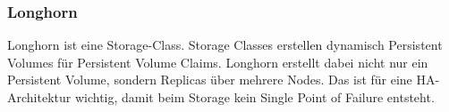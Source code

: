 \subsubsection{Longhorn}
Longhorn ist eine Storage-Class. Storage Classes erstellen dynamisch Persistent Volumes für Persistent Volume Claims.
Longhorn erstellt dabei nicht nur ein Persistent Volume, sondern Replicas über mehrere Nodes.
Das ist für eine HA-Architektur wichtig, damit beim Storage kein Single Point of Failure entsteht.